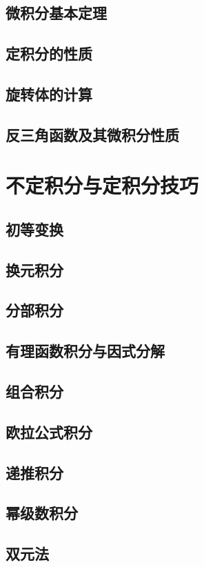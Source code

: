\documentclass[12pt,a4paper,UTF8]{ctexbook}
\theoremstyle{plain}
\begin{document}
\section{微积分基本定理}
\section{定积分的性质}
\section{旋转体的计算}
\section{反三角函数及其微积分性质}

\chapter{不定积分与定积分技巧}
\section{初等变换}
\section{换元积分}
\section{分部积分}
\section{有理函数积分与因式分解}
\section{组合积分}
\section{欧拉公式积分}
\section{递推积分}
\section{幂级数积分}
\section{双元法}
\end{document}
